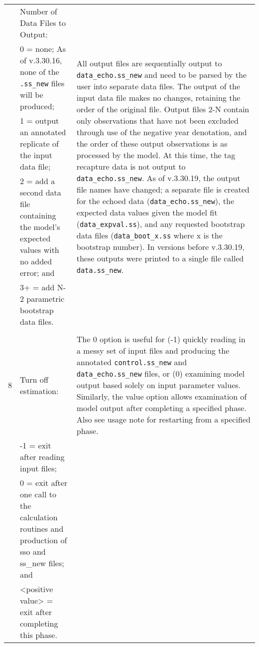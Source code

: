 {\begin{landscape}
\begin{longtable}{p{1.5cm} p{7.2cm} p{12.3cm}}
 \pagebreak
 \hline
 1 & Number of Data Files to Output: & \multirow{5}{12.3cm}[-0.25cm]{\parbox{12.3cm}{All output files are sequentially output to \texttt{data\_echo.ss\_new} and need to be parsed by the user into separate data files. The output of the input data file makes no changes, retaining the order of the original file. Output files 2-N contain only observations that have not been excluded through use of the negative year denotation, and the order of these output observations is as processed by the model. At this time, the tag recapture data is not output to \texttt{data\_echo.ss\_new}. As of v.3.30.19, the output file names have changed; a separate file is created for the echoed data (\texttt{data\_echo.ss\_new}), the expected data values given the model fit (\texttt{data\_expval.ss}), and any requested bootstrap data files (\texttt{data\_boot\_x.ss} where x is the bootstrap number). In versions before v.3.30.19, these outputs were printed to a single file called \texttt{data.ss\_new}.}} \Tstrut\Bstrut\\
   & 0 = none; As of v.3.30.16, none of the \texttt{.ss\_new} files will be produced; & \Bstrut\\
   & 1 = output an annotated replicate of the input data file; & \Tstrut\Bstrut\\
   & 2 = add a second data file containing the model's expected values with no added error; and & \Tstrut\Bstrut\\
   & 3+ = add N-2 parametric bootstrap data files. & \Tstrut\\
   & & \\

 \hline
 8 & Turn off estimation: & \multirow{1}{12.3cm}[-0.25cm]{\parbox{12.3cm}{The 0 option is useful for (-1) quickly reading in a messy set of input files and producing the annotated \texttt{control.ss\_new} and \texttt{data\_echo.ss\_new} files, or (0) examining model output based solely on input parameter values. Similarly, the value option allows examination of model output after completing a specified phase. Also see usage note for restarting from a specified phase.}} \Tstrut\\
   & -1 = exit after reading input files; & \\
   & 0 = exit after one call to the calculation routines and production of sso and ss\_new files; and & \\
   & <positive value> = exit after completing this phase. & \Bstrut\\	  
	     

\end{longtable}
\end{landscape}}
